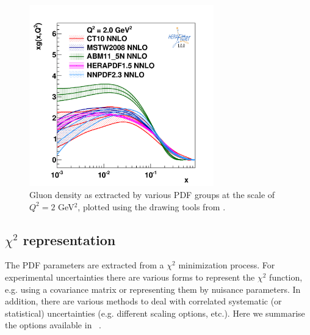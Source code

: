 %
\begin{figure}[!ht]
   \centering
   \includegraphics[width=8cm]{pdfs.pdf}
   \caption{Gluon density as extracted by various PDF groups at the scale of $Q^2=2$ GeV$^2$, plotted using the drawing tools from \fitter.} 
 \label{fig:pdfs}
\end{figure}
%
\subsection{$\chi^2$ representation}
\label{sec:chi2representation}

The PDF parameters are extracted from a $\chi^2$ minimization process. 
For experimental uncertainties there are various forms to represent the $\chi^2$ function, e.g. using a covariance matrix or representing them by nuisance parameters. 
In addition, there are various methods to deal with correlated systematic (or statistical) uncertainties (e.g. different scaling options, etc.). Here we summarise the options available in \fitter\ . 

